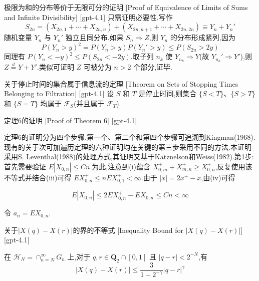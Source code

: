 \documentclass[UTF8]{ctexart}
\begin{document}
    
    
    \begin{prf}
        {极限为和的分布等价于无限可分的证明}
        [Proof of Equivalence of Limits of Sums and Infinite Divisibility]
        [gpt-4.1]
        只需证明必要性.写作
\[
S_{2n} = ( X_{2n,1} + \cdots + X_{2n,n} ) + ( X_{2n,n+1} + \cdots + X_{2n,2n} ) \equiv Y_n + Y_n'
\]
随机变量 $Y_n$ 与 $Y_n'$ 独立且同分布.如果 $S_n \Rightarrow Z$,则 $Y_n$ 的分布形成紧列,因为
\[
P ( Y_n > y )^2 = P ( Y_n > y ) P ( Y_n' > y ) \leq P ( S_{2n} > 2y )
\]
同理有 $P ( Y_n < -y )^2 \leq P ( S_{2n} < -2y )$.取子列 $n_k$ 使 $Y_{n_k} \Rightarrow Y$(故 $Y_{n_k}' \Rightarrow Y'$),则 $Z \overset{d}{=} Y + Y'$.类似可证明 $Z$ 可被分为 $n > 2$ 个部分,证毕.

    \end{prf}
    
    
    
    \begin{thm}
        {关于停止时间的集合属于信息流的定理}
        [Theorem on Sets of Stopping Times Belonging to Filtration]
        [gpt-4.1]
        设 $S$ 和 $T$ 是停止时间,则集合 $\{ S < T \}$、$\{ S > T \}$ 和 $\{ S = T \}$ 均属于 $\mathcal{F}_{S}$(并且属于 $\mathcal{F}_{T}$).
    \end{thm}
    
    
    
    \begin{prf}
        {定理6的证明}
        [Proof of Theorem 6]
        [gpt-4.1]
        
定理6的证明分为四个步骤.第一个、第二个和第四个步骤可追溯到Kingman(1968).现有的关于次可加遍历定理的六种证明均在关键的第三步采用不同的方法.本证明采用S. Leventhal(1988)的处理方式,其证明又基于Katznelson和Weiss(1982).第1步:首先需要验证 $E | X_{0,n} | \leq C n$.为此,注意到(i)蕴含 $X_{0,m}^{+} + X_{m,n}^{+} \geq X_{0,n}^{+}$,反复使用该不等式并结合(iii)可得 $E X_{0,n}^{+} \leq n E X_{0,1}^{+} < \infty$.由于 $|x| = 2 x^{+} - x$,由(iv)可得

\[
E | X_{0,n} | \leq 2 E X_{0,n}^{+} - E X_{0,n} \leq C n < \infty
\]

令 $a_{n} = E X_{0,n}$.

    \end{prf}
    
    
    
    \begin{lma}
        {关于$|X(q) - X(r)|$的界的不等式}
        [Inequality Bound for $|X(q) - X(r)|$]
        [gpt-4.1]
        
在 ${\mathcal{H}}_N = \cap_{n=N}^{\infty} G_n$ 上,对于 $q, r \in \mathbf{Q}_2 \cap [0, 1]$ 且 $|q - r| < 2^{-N}$,有
\[
|X(q) - X(r)| \leq \frac{3}{1 - 2^{-\gamma}} |q - r|^\gamma
\]

    \end{lma}
    
\end{document}
